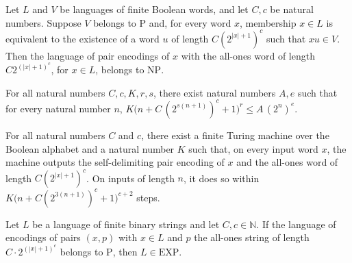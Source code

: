 \begin{lemma}
\label{Complexity.a3n_pad_mem_NP}
\leanok
{}
Let $L$ and $V$ be languages of finite Boolean words, and let $C,c$ be natural numbers.
Suppose $V$ belongs to $\mathrm{P}$ and, for every word $x$, membership $x\in L$ is
equivalent to the existence of a word $u$ of length $C(2^{|x|+1})^c$ such that $xu\in
V$. Then the language of pair encodings of $x$ with the all-ones word of length
$C2^{(|x|+1)^c}$, for $x\in L$, belongs to $\mathrm{NP}$.
\end{lemma}

\begin{lemma}
\label{Complexity.a3n_scaled_envelope}
\leanok
{}
For all natural numbers $C,c,K,r,s$, there exist natural numbers $A,e$ such that for
every natural number $n$, $K\bigl(n+C\,(2^{s(n+1)})^c+1\bigr)^r\le A\,(2^n)^e$.
\end{lemma}

\begin{lemma}
\label{Complexity.a3n_pad_emit}
\leanok
{}
For all natural numbers $C$ and $c$, there exist a finite Turing machine over the
Boolean alphabet and a natural number $K$ such that, on every input word $x$, the
machine outputs the self-delimiting pair encoding of $x$ and the all-ones word of length
$C(2^{|x|+1})^c$. On inputs of length $n$, it does so within
$K\bigl(n+C(2^{3(n+1)})^c+1\bigr)^{c+2}$ steps.
\end{lemma}

\begin{lemma}
\label{Complexity.a3n_unpad_EXP}
\leanok
{}
Let $L$ be a language of finite binary strings and let $C,c\in\mathbb{N}$. If the
language of encodings of pairs $(x,p)$ with $x\in L$ and $p$ the all-ones string of
length $C\cdot 2^{(|x|+1)^c}$ belongs to $\mathrm{P}$, then $L\in\mathrm{EXP}$.
\end{lemma}


